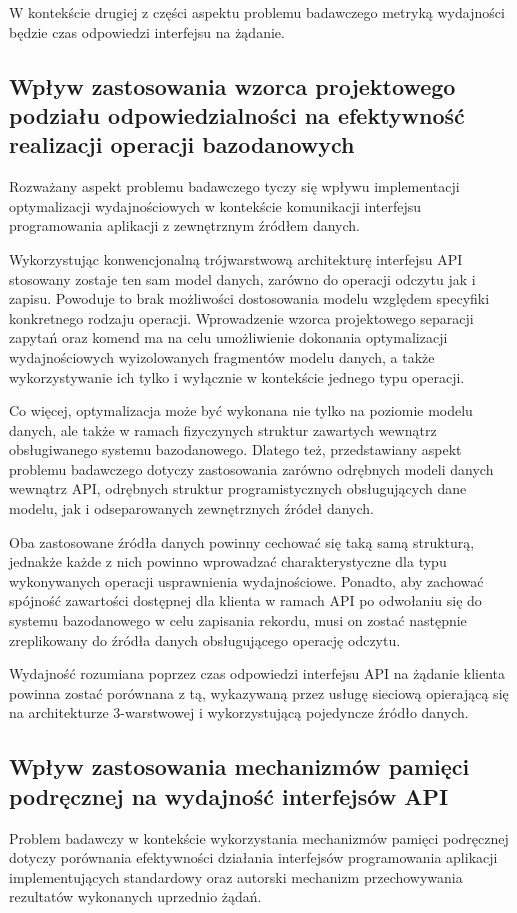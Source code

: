 W kontekście drugiej z części aspektu problemu badawczego metryką wydajności będzie czas odpowiedzi interfejsu na żądanie.
\subsection*{Wpływ zastosowania wzorca projektowego podziału odpowiedzialności na efektywność realizacji operacji bazodanowych}
Rozważany aspekt problemu badawczego tyczy się wpływu implementacji optymalizacji wydajnościowych w kontekście komunikacji interfejsu programowania aplikacji z zewnętrznym źródłem danych.

Wykorzystując konwencjonalną trójwarstwową architekturę interfejsu API stosowany zostaje ten sam model danych, zarówno do operacji odczytu jak i zapisu. Powoduje to brak możliwości dostosowania modelu względem specyfiki konkretnego rodzaju operacji. Wprowadzenie wzorca projektowego separacji zapytań oraz komend ma na celu umożliwienie dokonania optymalizacji wydajnościowych wyizolowanych fragmentów modelu danych, a także wykorzystywanie ich tylko i wyłącznie w kontekście jednego typu operacji.

Co więcej, optymalizacja może być wykonana nie tylko na poziomie modelu danych, ale także w ramach fizyczynych struktur zawartych wewnątrz obsługiwanego systemu bazodanowego. Dlatego też, przedstawiany aspekt problemu badawczego dotyczy zastosowania zarówno odrębnych modeli danych wewnątrz API, odrębnych struktur programistycznych obsługujących dane modelu, jak i odseparowanych zewnętrznych źródeł danych.

Oba zastosowane źródła danych powinny cechować się taką samą strukturą, jednakże każde z nich powinno wprowadzać charakterystyczne dla typu wykonywanych operacji usprawnienia wydajnościowe. Ponadto, aby zachować spójność zawartości dostępnej dla klienta w ramach API po odwołaniu się do systemu bazodanowego w celu zapisania rekordu, musi on zostać następnie zreplikowany do źródła danych obsługującego operację odczytu.

Wydajność rozumiana poprzez czas odpowiedzi interfejsu API na żądanie klienta powinna zostać porównana z tą, wykazywaną przez usługę sieciową opierającą się na architekturze 3-warstwowej i wykorzystującą pojedyncze źródło danych.
\subsection*{Wpływ zastosowania mechanizmów pamięci podręcznej na wydajność interfejsów API}
Problem badawczy w kontekście wykorzystania mechanizmów pamięci podręcznej dotyczy porównania efektywności działania interfejsów programowania aplikacji implementujących standardowy oraz autorski mechanizm przechowywania rezultatów wykonanych uprzednio żądań.

